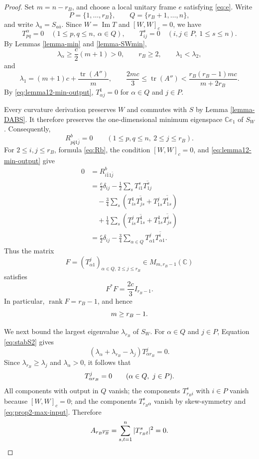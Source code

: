 \documentclass[10pt,a4paper]{amsart}
\newcommand{\C}{{\mathbb C}}
\begin{document}
\begin{proof}
  {Set $m=n-r_B$, and choose } a local unitary frame   {$e$ satisfying
\eqref{eq:e}. Write
}\[
 {P=\{1,\ldots,r_B\},\qquad Q=\{r_B+1,\ldots,n\},
}\]
{and write $\lambda_a=S_{a\bar a}$. Since $W=\operatorname{Im}T$ } and
 $[W,W]_c=0$, we have
  \[
 {T^\alpha_{pq}=0
 \quad (1\leq p,q\leq n,\ \alpha\in Q),
 \qquad
 T^s_{ij}=0
 \quad (i,j\in P,\ 1\leq s\leq n).
}\]
  {By Lemmas \ref{lemma-min} and \ref{lemma-SWmin},
}\[
 {\lambda_\alpha\geq\frac{c}{2}(m+1)>0,\qquad
 r_B\geq2,\qquad \lambda_1<\lambda_2,
}\]
{and
}\[
 {\lambda_1=(m+1)c+\frac{\operatorname{tr}(A'')}{m},\qquad
 \frac{2mc}{3}\leq\operatorname{tr}(A'')<
 \frac{r_B(r_B-1)mc}{m+2r_B}.
}\]
{By \eqref{eq:lemma12-min-output},
$T^1_{\alpha j}=0$ for $\alpha\in Q$ and $j\in P$.
}

{Every curvature derivation } preserves $W$  and commutes with $S$ by
Lemma \ref{lemma-DABS}{. It therefore preserves the one-dimensional
minimum eigenspace $\C e_1$ } of $S_W${. Consequently,
}\[
 {R^b_{p\bar q1\bar j}=0
 \qquad (1\leq p,q\leq n,\ 2\leq j\leq r_B).
}\]
{For } $2\leq i,j\leq r_B$,  {formula \eqref{eq:Rb}, the condition
$[W,W]_c=0$, and \eqref{eq:lemma12-min-output} give
}\begin{align*}
{0
 }&{=R^b_{i\bar1 1\bar j} }\\
 &{=\frac{c}{2}\delta_{ij}
   -\frac{1}{2}\sum_sT^s_{i1}\overline{T^s_{1j}}}\\
 &{\quad-\frac{3}{4}\sum_s\left(
   T^1_{is}\overline{T^1_{js}}
   +T^j_{1s}\overline{T^i_{1s}}\right)}\\
 &{\quad+\frac{1}{4}\sum_s\left(
   T^j_{is}\overline{T^1_{1s}}
   +T^1_{1s}\overline{T^i_{js}}\right)}\\
 &{=\frac{c}{2}\delta_{ij}
   -\frac{3}{4}\sum_{\alpha\in Q}
   T^j_{\alpha1}\overline{T^i_{\alpha1}}.
}\end{align*}
  {Thus the matrix
}\[
 {F=(T^j_{\alpha1})_{\alpha\in Q,\ 2\leq j\leq r_B}
 \in M_{m,r_B-1}(\C)
}\]
  {satisfies
}\[
 {F^\ast F=\frac{2c}{3}I_{r_B-1}.
}\]
{In particular, $\operatorname{rank}F=r_B-1$, and hence
}\begin{equation}{\label{eq:rm}
 m\geq r_B-1.
}\end{equation}

{We next bound } the largest eigenvalue $\lambda_{r_B}$   {of } $S_W$.   {For
$\alpha\in Q$ } and  $j\in P$,   {Equation \eqref{eq:stabS2} gives
}\[
 {(\lambda_\alpha+\lambda_{r_B}-\lambda_j)T^j_{\alpha r_B}=0.
}\]
  {Since $\lambda_{r_B}\geq\lambda_j$ and $\lambda_\alpha>0$, it follows that
}\begin{equation}{\label{eq:prop2-max-input}
 T^j_{\alpha r_B}=0
 \qquad (\alpha\in Q,\ j\in P).
}\end{equation}
  {All components with output in $Q$ vanish; the components
$T^s_{r_Bi}$ with $i\in P$ vanish because $[W,W]_c=0$; and the components
$T^s_{r_B\alpha}$ vanish by skew-symmetry and
\eqref{eq:prop2-max-input}. Therefore
}\begin{equation}{\label{eq:prop2-Arr}
 A_{r_B\overline{r_B}}=\sum_{s,t=1}^n|T^s_{r_Bt}|^2=0.
}\end{equation}


\end{proof}
\end{document}
